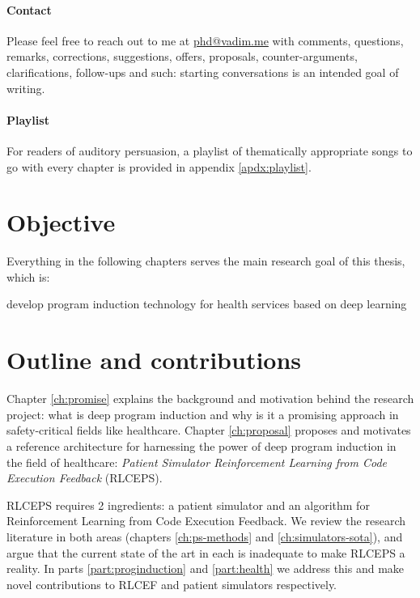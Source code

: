 \paragraph{Contact}

Please feel free to reach out to me at \url{phd@vadim.me} with comments, questions, remarks, corrections, suggestions, offers, proposals, counter-arguments, clarifications, follow-ups and such: starting conversations is an intended goal of writing.

\paragraph{Playlist}

For readers of auditory persuasion, a playlist of thematically appropriate songs to go with every chapter is provided in appendix \ref{apdx:playlist}.

\section{Objective}
\label{sec:objective}

Everything in the following chapters serves the main research goal of this thesis, which is:

\begin{highlight}
    develop program induction technology for health services based on deep learning
\end{highlight}

\section{Outline and contributions}

Chapter \ref{ch:promise} explains the background and motivation behind the research project: what is deep program induction and why is it a promising approach in safety-critical fields like healthcare. Chapter \ref{ch:proposal} proposes and motivates a reference architecture for harnessing the power of deep program induction in the field of healthcare: \emph{Patient Simulator Reinforcement Learning from Code Execution Feedback} (RLCEPS).

RLCEPS requires 2 ingredients: a patient simulator and an algorithm for Reinforcement Learning from Code Execution Feedback.
We review the research literature in both areas (chapters \ref{ch:ps-methods} and \ref{ch:simulators-sota}), and argue that the current state of the art in each is inadequate to make RLCEPS a reality.
In parts \ref{part:proginduction} and \ref{part:health} we address this and make novel contributions to RLCEF and patient simulators respectively.

